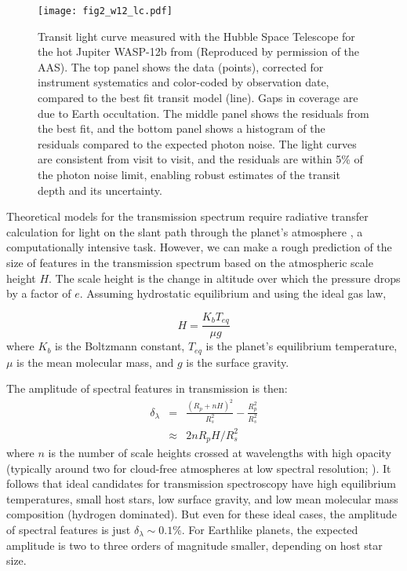 \documentclass[graybox,natbib,nosecnum]{svmult}
\begin{document}
\begin{figure}
\begin{centering}
\texttt{[image: fig2\_w12\_lc.pdf]}
\caption{Transit light curve measured with the Hubble Space Telescope for the hot Jupiter WASP-12b from \citealt{kreidberg15b} (Reproduced by permission of the AAS). The top panel shows the data (points), corrected for instrument systematics and color-coded by observation date, compared to the best fit transit model (line). Gaps in coverage are due to Earth occultation. The middle panel shows the residuals from the best fit, and the bottom panel shows a histogram of the residuals compared to the expected photon noise. The light curves are consistent from visit to visit, and the residuals are within 5\% of the photon noise limit, enabling robust estimates of the transit depth and its uncertainty.}
\label{fig:lc}       
\end{centering}
\end{figure}

Theoretical models for the transmission spectrum require radiative transfer calculation for light on the slant path through the planet's atmosphere \citep{seager00}, a computationally intensive task. However, we can make a rough prediction of the size of features in the transmission spectrum based on the atmospheric scale height $H$. The scale height is the change in altitude over which the pressure drops by a factor of $e$. Assuming hydrostatic equilibrium and using the ideal gas law,

\begin{equation}
H = \frac{K_bT_{eq}}{\mu g}
\end{equation}
where $K_b$ is the Boltzmann constant, $T_{eq}$ is the planet's equilibrium temperature, $\mu$ is the mean molecular mass, and $g$ is the surface gravity.

The amplitude of spectral features in transmission is then:
\begin{eqnarray}
\delta_\lambda &=& \frac{(R_p + nH)^2}{R_s^2} - \frac{R_p^2}{R_s^2}\\
 & \approx & 2nR_pH/R_s^2
\end{eqnarray} 
where $n$ is the number of scale heights crossed at wavelengths with high opacity (typically around two for cloud-free atmospheres at low spectral resolution; \citealt{stevenson16}). It follows that ideal candidates for transmission spectroscopy have high equilibrium temperatures, small host stars, low surface gravity, and low mean molecular mass composition (hydrogen dominated). But even for these ideal cases, the amplitude of spectral features is just $\delta_\lambda \sim0.1\%$. For Earthlike planets, the expected amplitude is two to three orders of magnitude smaller, depending on host star size. 
\end{document}
